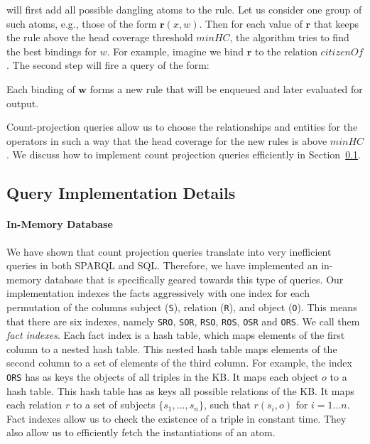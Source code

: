 
\noindent will first add all possible dangling atoms to the rule. Let us consider one group of such atoms, e.g., those of the form
$\bm{r}(x,w)$. Then for each
value of $\bm{r}$ that keeps the rule above the head coverage threshold $minHC$, the algorithm tries to find the best bindings for
$w$. For example, imagine we bind $\bm{r}$ to the relation $citizenOf$. The second step will fire a query of the form:


\noindent Each binding of $\bm{w}$ forms a new rule that will be enqueued and later evaluated for output.

Count-projection queries allow us to choose the relationships and entities for the operators
in such a way that the head coverage for the new rules is above $minHC$.
We discuss how to implement count projection queries efficiently in Section~\ref{subsec:implementation}.

\subsection{Query Implementation Details}
\label{subsec:implementation}

\paragraph{In-Memory Database} We have shown \cite{amie} that count projection queries translate into very inefficient queries in both SPARQL and SQL. Therefore, we have implemented an in-memory database that is specifically geared towards this type of queries.
Our implementation indexes the facts aggressively with one index for each permutation of
the columns subject (\texttt{S}), relation (\texttt{R}), and object (\texttt{O}). This means that there are six indexes, namely \texttt{SRO}, \texttt{SOR}, \texttt{RSO}, \texttt{ROS}, \texttt{OSR} and \texttt{ORS}. We call them \emph{fact indexes}.
Each fact index is a hash table, which maps elements of the first column to a nested hash table. This nested hash table maps elements of the second column to a set of elements of the third column. For example, the index \texttt{ORS} has as keys the objects of all triples in the KB. It maps each object $o$ to a hash table. This hash table has as keys all possible relations of the KB. It maps each relation $r$ to a set of subjects $\{s_1,...,s_n\}$, such that $r(s_i, o)$ for $i=1...n$.
Fact indexes allow us to check the existence of a triple in constant time. They also allow us to efficiently fetch the instantiations of an atom.

